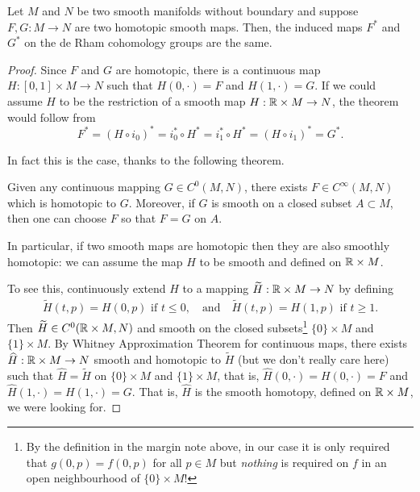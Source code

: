 \begin{theorem}
	Let $M$ and $N$ be two smooth manifolds without boundary and suppose $F,G: M\to N$ are two homotopic smooth maps.
	Then, the induced maps $F^*$ and $G^*$ on the de Rham cohomology groups are the same.
\end{theorem}
\begin{proof}
	Since $F$ and $G$ are homotopic, there is a continuous map $H: [0,1]\times M \to N$ such that $H(0,\cdot) = F$ and $H(1,\cdot) = G$.
	If we could assume $H$ to be the restriction of a smooth map $H:\mathbb{R}\times M\to N$, the theorem would follow from
	\begin{equation}
		F^* = (H\circ i_0)^* = i_0^*\circ H^* = i_1^*\circ H^* = (H\circ i_1)^* = G^*.
	\end{equation}

	In fact this is the case, thanks to the following theorem.
	\begin{theorem}\label{thm:WhitneyApproxCont}
		Given any continuous mapping $G \in C^0(M,N)$, there exists $F \in C^\infty(M,N)$ which is homotopic to $G$. Moreover, if $G$ is smooth on a closed subset $A\subset M$, then one can choose $F$ so that $F=G$ on $A$.
	\end{theorem}
	In particular, if two smooth maps are homotopic then they are also smoothly homotopic: we can assume the map $H$ to be smooth and defined on $\mathbb{R}\times M$.

	To see this, continuously extend $H$ to a mapping $\widetilde H : \mathbb{R} \times M \to N$ by defining
	\begin{align}
		\widetilde H(t, p) = H(0, p) \mbox{ if } t \leq 0,
		\quad\mbox{and}\quad \widetilde H(t, p) = H(1, p) \mbox{ if } t \geq 1.
	\end{align}
	Then $\widetilde H \in C^0(\mathbb{R}\times M, N)$ and smooth on the closed subsets\footnote{By the definition in the margin note above, in our case it is only required that $g(0, p) = f(0,p)$ for all $p\in M$ but \emph{nothing} is required on $f$ in an open neighbourhood of $\{0\}\times M$!} $\{0\}\times M$ and $\{1\}\times M$.
	By Whitney Approximation Theorem for continuous maps, there exists $\widehat H : \mathbb{R}\times M \to N$ smooth and homotopic to $\widetilde H$ (but we don't really care here) such that $\widehat H = \widetilde H$ on $\{0\}\times M$ and $\{1\}\times M$, that is, $\widehat H(0, \cdot) = H(0, \cdot) = F$ and $\widehat H(1, \cdot) = H(1, \cdot) = G$.
	That is, $\widehat H$ is the smooth homotopy, defined on $\mathbb{R}\times M$, we were looking for.
\end{proof}

